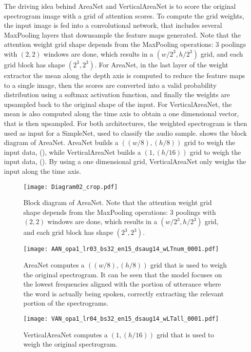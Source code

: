 The driving idea behind AreaNet and VerticalAreaNet is to score the original
spectrogram image with a grid of attention scores.
%
To compute the grid weights, the input image is fed into a convolutional
network, that includes several MaxPooling layers that downsample the feature
maps generated.
%
Note that the attention weight grid shape depends from the MaxPooling
operations: $3$ poolings with $(2, 2)$ windows are done, which results in a
$(w/2^3, h/2^3)$ grid, and each grid block has shape $(2^3, 2^3)$.
%
For AreaNet, in the last layer of the weight extractor the mean along the depth
axis is computed to reduce the feature maps to a single image, then the scores
are converted into a valid probability distribution using a softmax activation
function, and finally the weights are upsampled back to the original shape of
the input.
%
For VerticalAreaNet, the mean is also computed along the time axis to obtain a
one dimensional vector, that is then upsampled.
%
For both architectures, the weighted spectrogram is then used as input for a
SimpleNet, used to classify the audio sample.
%
 shows the block diagram of AreaNet.
%
AreaNet builds a $((w/8), (h/8))$ grid to weigh the input data,
(), while VerticalAreaNet builds a $(1,
(h/16))$ grid to weigh the input data, ().
By using a one dimensional grid, VerticalAreaNet only weighs the input along
the time axis.

\begin{figure}[h!]
    \centering
    \texttt{[image: Diagram02\_crop.pdf]}
    \caption{Block diagram of AreaNet.
        Note that the attention weight grid shape depends from the
        MaxPooling operations: $3$ poolings with $(2, 2)$ windows
        are done, which results in a $(w/2^3, h/2^3)$ grid,
        and each grid block has shape $(2^3, 2^3)$.
    }%
    \label{fig:areanet_diagram_blocks}
\end{figure}

\begin{figure}[t!]
    \centering
    \texttt{[image: AAN\_opa1\_lr03\_bs32\_en15\_dsaug14\_wLTnum\_0001.pdf]}
    \caption{AreaNet computes a $((w/8), (h/8))$ grid that is used to weigh the
    original spectrogram.
    It can be seen that the model focuses on the lowest frequencies aligned
    with the portion of utterance where the word is actually being spoken,
    correctly extracting the relevant portion of the spectrograms. }%
    \label{fig:attention_weights_area}
\end{figure}

\begin{figure}[t!]
    \centering
    \texttt{[image: VAN\_opa1\_lr04\_bs32\_en15\_dsaug14\_wLTall\_0001.pdf]}
    \caption{VerticalAreaNet computes a $(1, (h/16))$ grid that is used to
        weigh the original spectrogram.
    }%
    \label{fig:attention_weights_vertical}
\end{figure}

